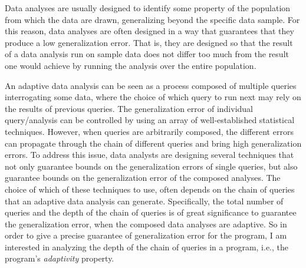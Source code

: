 Data analyses are usually designed to identify some property of the population from which the data are drawn, 
generalizing beyond the specific data sample. For this reason, data analyses are often designed in a way that guarantees that they produce a low generalization error.
 That is, they are designed so that the result of a data analysis run on sample 
 data does not differ too much from the result one would achieve by running the analysis over the entire population. 
 
 An adaptive data analysis can be seen as a process composed of multiple queries interrogating some data, where the choice of which query to run next may rely on the results of previous queries. 
 The generalization error of individual query/analysis can be controlled by using an array of well-established statistical techniques.
 However, when queries are arbitrarily composed, the different errors can propagate through the chain of different queries and bring high generalization errors. 
 To address this issue, data analysts are designing several techniques that not only guarantee bounds on the generalization errors of single queries, but also guarantee bounds on the generalization error of the composed analyses. 
 The choice of which of these techniques to use, 
 often depends on the chain of queries that an adaptive data analysis can generate.
 Specifically, the total number of queries and the depth of the chain of queries is of great significance 
 to guarantee the generalization error, 
 when the composed data analyses are adaptive. 
 So in order to give a precise guarantee of generalization error
 for the program,
 I am interested in analyzing the depth of the chain of queries in a program, i.e., the program's \emph{adaptivity} property.

